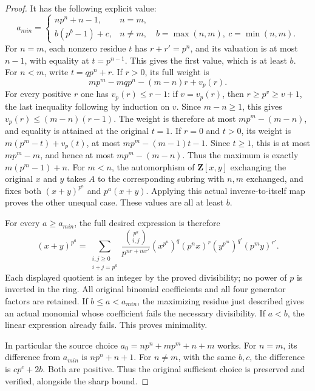 \begin{proof}
It has the following explicit value:
$$
a_{min}=
\begin{cases}
n p^n+n-1,&n=m,\\
b(p^b-1)+c,&n\neq m,\quad
b=\max(n,m),\ c=\min(n,m).
\end{cases}
$$
For $n=m$, each nonzero residue $t$
has $r+r'=p^n$, and its valuation
is at most $n-1$, with equality at
$t=p^{n-1}$. This gives the first
value, which is at least $b$.
For $n<m$, write $t=q p^n+r$.
If $r>0$, its full weight is
$$
m p^m-m q p^n-(m-n)r+v_p(r).
$$
For every positive $r$ one has
$v_p(r)\leq r-1$: if $v=v_p(r)$,
then $r\geq p^v\geq v+1$, the
last inequality following by
induction on $v$. Since $m-n\geq1$,
this gives
$v_p(r)\leq(m-n)(r-1)$.
The weight is therefore at most
$m p^m-(m-n)$, and equality is
attained at the original $t=1$.
If $r=0$ and $t>0$, its weight is
$m(p^m-t)+v_p(t)$, at most
$m p^m-(m-1)t-1$. Since $t\geq1$,
this is at most $m p^m-m$, and
hence at most $m p^m-(m-n)$.
Thus the maximum is exactly
$m(p^m-1)+n$. For $m<n$, the
automorphism of $\mathbf Z[x,y]$
exchanging the original $x$ and
$y$ takes $A$ to the corresponding
subring with $n,m$ exchanged, and
fixes both $(x+y)^{p^a}$ and
$p^a(x+y)$. Applying this actual
inverse-to-itself map proves the
other unequal case. These values
are all at least $b$.

For every $a\geq a_{min}$, the full
desired expression is therefore
$$
(x+y)^{p^a}=
\sum_{\substack{i,j\geq0\\i+j=p^a}}
\frac{\binom{p^a}{i,j}}{p^{nr+mr'}}
(x^{p^n})^q(p^n x)^r
(y^{p^m})^{q'}(p^m y)^{r'}.
$$
Each displayed quotient is an
integer by the proved divisibility;
no power of $p$ is inverted in the
ring. All original binomial
coefficients and all four generator
factors are retained. If $b\leq a<a_{min}$,
the maximizing residue just described
gives an actual monomial whose
coefficient fails the necessary
divisibility. If $a<b$, the linear
expression already fails. This
proves minimality.

In particular the source choice
$a_0=n p^n+m p^m+n+m$ works.
For $n=m$, its difference from
$a_{min}$ is $n p^n+n+1$.
For $n\neq m$, with the same
$b,c$, the difference is $c p^c+2b$.
Both are positive. Thus the original
sufficient choice is preserved and
verified, alongside the sharp bound.
\end{proof}